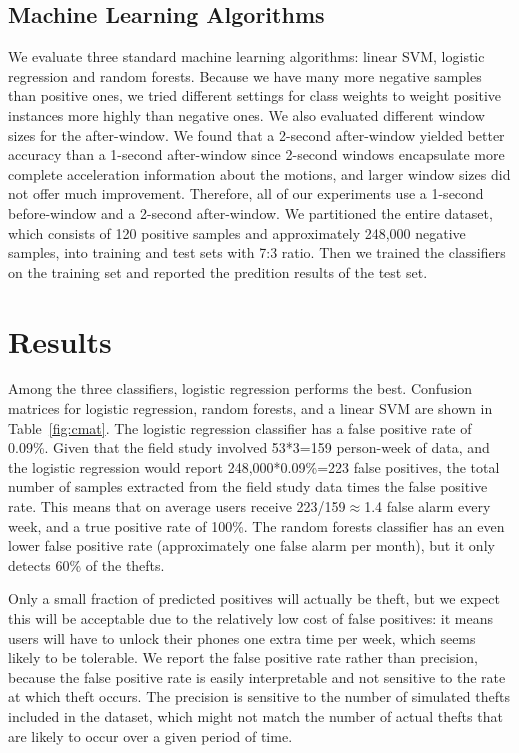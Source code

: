 \subsection{Machine Learning Algorithms}
We evaluate three standard machine learning algorithms: linear SVM, logistic regression and random forests.
Because we have many more negative samples than positive ones, we tried different settings for class weights to weight positive instances more highly than negative ones.
We also evaluated different window sizes for the after-window.
We found that a 2-second after-window yielded better accuracy than a 1-second after-window since 2-second windows encapsulate more complete acceleration information about the motions, and larger window sizes did not offer much improvement.
Therefore, all of our experiments use a 1-second before-window and a 2-second after-window.
We partitioned the entire dataset, which consists of 120 positive samples and approximately 248,000 negative samples, into training and test sets with 7:3 ratio.
Then we trained the classifiers on the training set and reported the predition results of the test set.



\section{Results}
Among the three classifiers, logistic regression performs the best.
Confusion matrices for logistic regression, random forests, and a linear SVM
are shown in Table~\ref{fig:cmat}.
The logistic regression classifier has a false positive rate of 0.09\%. Given that the field study involved 53*3=159 person-week of data, and the logistic regression would report 248,000*0.09\%=223 false positives, the total number of samples extracted from the field study data times the false positive rate. This means that on average users receive 223/159$\approx$1.4 false alarm every week, and a true positive rate of 100\%.
The random forests classifier has an even lower false positive rate (approximately one false alarm per month), but it only detects 60\% of the thefts.

Only a small fraction of predicted positives will actually be theft, but we expect this will be acceptable due to the relatively low cost of false positives: it means users will have to unlock their phones one extra time per week, which seems likely to be tolerable. We report the false positive rate rather than precision, because the false positive rate is easily interpretable and not sensitive to the rate at which theft occurs. The precision is sensitive to the number of simulated thefts included in the dataset, which might not match the number of actual thefts that are likely to occur over a given period of time.


